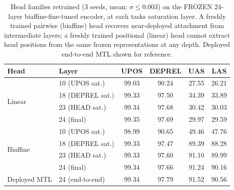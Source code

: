 \begin{table}[t]
\centering
\caption{Head families retrained (3 seeds, mean; $\sigma \leq 0.003$) on the FROZEN 24-layer biaffine-fine-tuned encoder, at each task\textquotesingle s saturation layer. A freshly trained pairwise (biaffine) head recovers near-deployed attachment from intermediate layers; a freshly trained positional (linear) head cannot extract head positions from the same frozen representations at any depth. Deployed end-to-end MTL shown for reference.}
\label{tab:frozen}
\begin{tabular}{llcccc}
\toprule
Head & Layer & UPOS & DEPREL & UAS & LAS \\
\midrule
\multirow{4}{*}{Linear} & 10 (UPOS sat.) & 99.03 & 90.24 & 27.55 & 26.21 \\
 & 18 (DEPREL sat.) & 99.33 & 97.50 & 34.39 & 33.89 \\
 & 23 (HEAD sat.) & 99.34 & 97.68 & 30.42 & 30.03 \\
 & 24 (final) & 99.35 & 97.69 & 29.97 & 29.59 \\
\midrule
\multirow{4}{*}{Biaffine} & 10 (UPOS sat.) & 98.99 & 90.65 & 49.46 & 47.76 \\
 & 18 (DEPREL sat.) & 99.33 & 97.47 & 89.39 & 88.28 \\
 & 23 (HEAD sat.) & 99.33 & 97.60 & 91.10 & 89.99 \\
 & 24 (final) & 99.34 & 97.66 & 91.24 & 90.16 \\
\midrule
Deployed MTL & 24 (end-to-end) & 99.34 & 97.79 & 91.52 & 90.56 \\
\bottomrule
\end{tabular}
\end{table}
